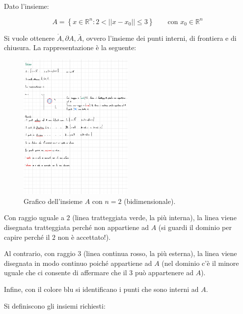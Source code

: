 \documentclass[a4paper]{article}
\begin{document}
	Dato l'insieme:
	
	\begin{equation*}
		A = \left\{x \in \mathbb{R}^{n} : 2 < \Big||x-x_{0}|\Big| \le 3\right\} \hspace{2em} \text{con } x_{0} \in \mathbb{R}^{n}
	\end{equation*}

	\noindent
	Si vuole ottenere $\mathring{A}, \partial A, \bar{A}$, ovvero l'insieme dei punti interni, di frontiera e di chiusura. La rappresentazione è la seguente:
	
	\begin{figure}[!htp]
		\centering
		\includegraphics[width=0.5\textwidth]{img/ex1_insiemi.pdf}
		\caption{Grafico dell'insieme $A$ con $n = 2$ (bidimensionale).}
	\end{figure}

	\noindent
	Con raggio uguale a $2$ (linea tratteggiata verde, la più interna), la linea viene disegnata tratteggiata perché non appartiene ad $A$ (si guardi il dominio per capire perché il $2$ non è accettato!).\newline
	
	\noindent
	Al contrario, con raggio $3$ (linea continua rosso, la più esterna), la linea viene disegnata in modo continuo poiché appartiene ad $A$ (nel dominio c'è il minore uguale che ci consente di affermare che il $3$ può appartenere ad $A$).\newline
	
	\noindent
	Infine, con il colore blu si identificano i punti che sono interni ad $A$.\newline
	
	\noindent
	Si definiscono gli insiemi richiesti:
	
\end{document}
